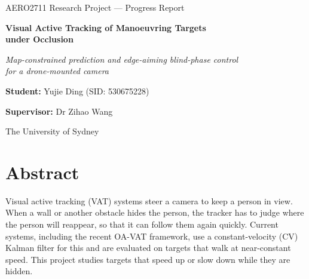 \documentclass[12pt,a4paper]{article}
\begin{document}
\begin{titlepage}
  \centering
  \vspace*{3cm}
  {\large\color{gray} AERO2711 Research Project --- Progress Report\par}
  \vspace{1cm}
  {\LARGE\bfseries Visual Active Tracking of Manoeuvring Targets\\ under Occlusion\par}
  \vspace{0.6cm}
  {\large\itshape Map-constrained prediction and edge-aiming blind-phase control\\ for a drone-mounted camera\par}
  \vspace{3cm}
  \textbf{Student:} Yujie Ding (SID: 530675228)\par
  \textbf{Supervisor:} Dr Zihao Wang\par
  \vspace{1.5cm}
  The University of Sydney\par
\end{titlepage}

\clearpage
\section*{Abstract}
Visual active tracking (VAT) systems steer a camera to keep a person in view. When a wall or another obstacle hides the person, the tracker has to judge where the person will reappear, so that it can follow them again quickly. Current systems, including the recent OA-VAT framework, use a constant-velocity (CV) Kalman filter for this and are evaluated on targets that walk at near-constant speed. This project studies targets that speed up or slow down while they are hidden.
\end{document}
